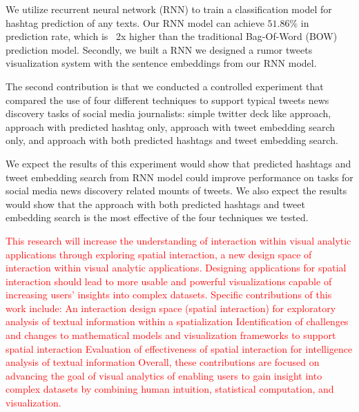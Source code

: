 We utilize recurrent neural network (RNN) to train a classification model for hashtag prediction of any texts. Our RNN model can achieve $51.86\%$ in prediction rate, which is ~2x higher than the traditional Bag-Of-Word (BOW) prediction model. Secondly, we built a RNN we designed a rumor tweets visualization system with the sentence embeddings from our RNN model. 


The second contribution is that we conducted a controlled experiment that compared the use of four different techniques to support typical tweets news discovery tasks of social media journalists: simple twitter deck like approach,  approach with predicted hashtag only, approach with tweet embedding search only,  and approach with both predicted hashtags and tweet embedding search.

We expect the results of this experiment would show that predicted hashtags and tweet embedding search from RNN model could improve performance on tasks for social media news discovery related mounts of tweets. We also expect the results would show that the approach with both predicted hashtags and tweet embedding search is the most effective of the four techniques we tested.


\textcolor{red}{
This research will increase the understanding of interaction within visual analytic applications through exploring spatial interaction, a new design space of interaction within visual analytic applications. Designing applications for spatial interaction should lead to more usable and powerful visualizations capable of increasing users’ insights into complex datasets. Specific contributions of this work include:
An interaction design space (spatial interaction) for exploratory analysis of textual information within a spatialization 
Identification of challenges and changes to mathematical models and visualization frameworks to support spatial interaction 
Evaluation of effectiveness of spatial interaction for intelligence analysis of textual information
Overall, these contributions are focused on advancing the goal of visual analytics of enabling users to gain insight into complex datasets by combining human intuition, statistical computation, and visualization.
}












